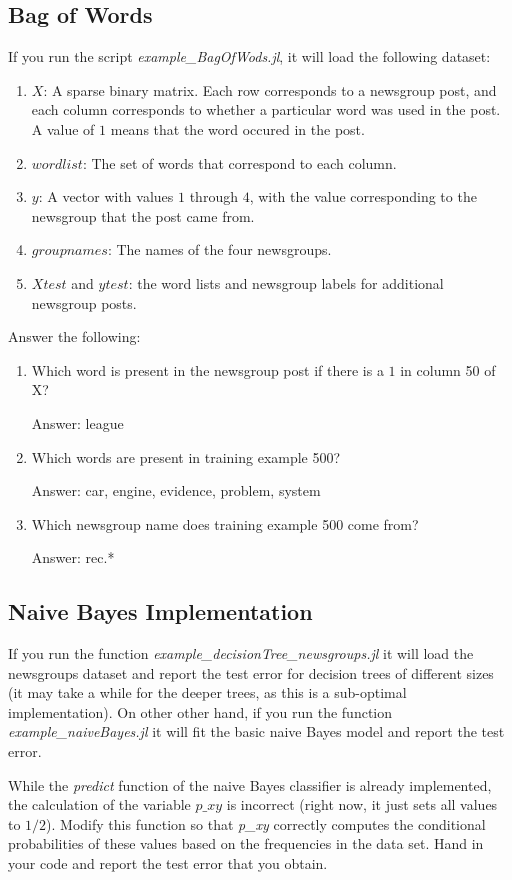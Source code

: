 \documentclass{article}
\def\ans#1{\par\gre{Answer: #1}}
\def\blu#1{{\color{blu}#1}}
\def\gre#1{{\color{gre}#1}}
\def\enum#1{\begin{enumerate}#1\end{enumerate}}
\begin{document}
\subsection{Bag of Words}

If you run the script \emph{example\_BagOfWods.jl}, it will load the following dataset:
\enum{
\item $X$: A sparse binary matrix. Each row corresponds to a newsgroup post, and each column corresponds to whether a particular word was used in the post. A value of $1$ means that the word occured in the post.
\item $wordlist$: The set of words that correspond to each column.
\item $y$: A vector with values $1$ through $4$, with the value corresponding to the newsgroup that the post came from.
\item $groupnames$: The names of the four newsgroups.
\item $Xtest$ and $ytest$: the word lists and newsgroup labels for additional newsgroup posts.
}
\blu{Answer the following}:
\enum{
\item Which word is present in the newsgroup post if there is a $1$ in column 50 of X?
\ans{league}
\item Which words are present in training example 500?
\ans{car, engine, evidence, problem, system}
\item Which newsgroup name does training example 500 come from?
\ans{rec.*}
}

\pagebreak

\subsection{Naive Bayes Implementation}

If you run the function \emph{example\_decisionTree\_newsgroups.jl} it will load the newsgroups dataset and report the test error for decision trees of different sizes (it may take a while for the deeper trees, as this is a sub-optimal implementation). On other other hand, if you run the function \emph{example\_naiveBayes.jl} it will fit the basic naive Bayes model and report the test error.

While the \emph{predict} function of the naive Bayes classifier is already implemented, the calculation of the variable $p\_xy$ is incorrect (right now, it just sets all values to $1/2$). \blu{Modify this function so that \emph{p\_xy} correctly computes the conditional probabilities of these values based on the frequencies in the data set. Hand in your code and report the test error that you obtain.}
\end{document}

